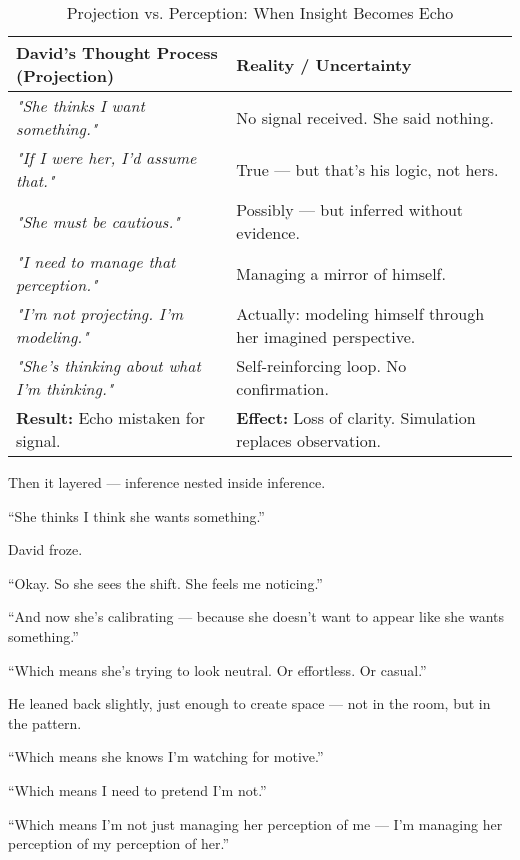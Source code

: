 \begin{table}[H]
  \centering
  \renewcommand{\arraystretch}{1.6}
  \begin{tabular}{>{\raggedright\arraybackslash}p{7cm} 
                  >{\raggedright\arraybackslash}p{7cm}}
  \toprule
  \textbf{David’s Thought Process (Projection)} & \textbf{Reality / Uncertainty} \\
  \midrule

  \textit{"She thinks I want something."} & No signal received. She said nothing. \\
  \textit{"If I were her, I’d assume that."} & True — but that’s his logic, not hers. \\
  \textit{"She must be cautious."} & Possibly — but inferred without evidence. \\
  \textit{"I need to manage that perception."} & Managing a mirror of himself. \\
  \textit{"I’m not projecting. I’m modeling."} & Actually: modeling himself through her imagined perspective. \\
  \textit{"She’s thinking about what I’m thinking."} & Self-reinforcing loop. No confirmation. \\
  \textbf{Result:} Echo mistaken for signal. & \textbf{Effect:} Loss of clarity. Simulation replaces observation. \\
  
  \bottomrule
  \end{tabular}
  \caption{Projection vs. Perception: When Insight Becomes Echo}
\end{table}

\medskip

Then it layered — inference nested inside inference.

“She thinks I think she wants something.”

David froze.

“Okay. So she sees the shift. She feels me noticing.”

“And now she’s calibrating — because she doesn’t want to appear like she wants something.”

“Which means she’s trying to look neutral. Or effortless. Or casual.”

He leaned back slightly, just enough to create space — not in the room, but in the pattern.

“Which means she knows I’m watching for motive.”

“Which means I need to pretend I’m not.”

“Which means I’m not just managing her perception of me — I’m managing her perception of my perception of her.”

